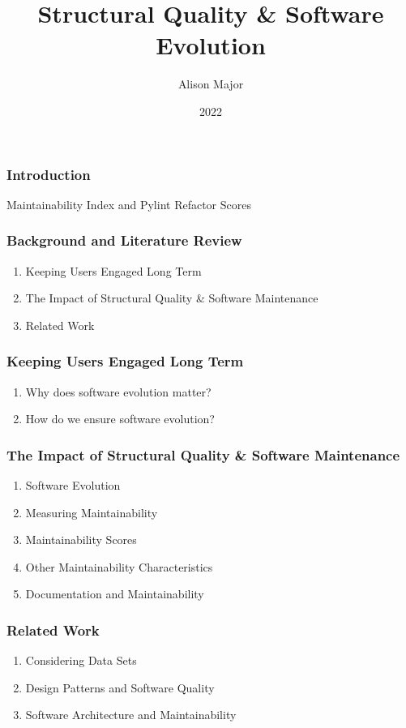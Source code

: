 \documentclass{beamer}
\title{Structural Quality \& Software Evolution}
\author{Alison Major}
\institute{Lewis University}
\date{2022}
\begin{document}
\frame{\titlepage}

\begin{frame}
  \frametitle{Introduction}
  Maintainability Index and Pylint Refactor Scores
\end{frame}

\begin{frame}
  \frametitle{Background and Literature Review}
  \begin{enumerate}
    \item Keeping Users Engaged Long Term
    \item The Impact of Structural Quality \& Software Maintenance
    \item Related Work
  \end{enumerate}
\end{frame}

\begin{frame}
  \frametitle{Keeping Users Engaged Long Term}
  \begin{enumerate}
    \item Why does software evolution matter?
    \item How do we ensure software evolution?
  \end{enumerate}
\end{frame}

\begin{frame}
  \frametitle{The Impact of Structural Quality \& Software Maintenance}
  \begin{enumerate}
    \item Software Evolution
    \item Measuring Maintainability
    \item Maintainability Scores
    \item Other Maintainability Characteristics
    \item Documentation and Maintainability
  \end{enumerate}
\end{frame}

\begin{frame}
  \frametitle{Related Work}
  \begin{enumerate}
    \item Considering Data Sets
    \item Design Patterns and Software Quality
    \item Software Architecture and Maintainability
  \end{enumerate}
\end{frame}
\end{document}
